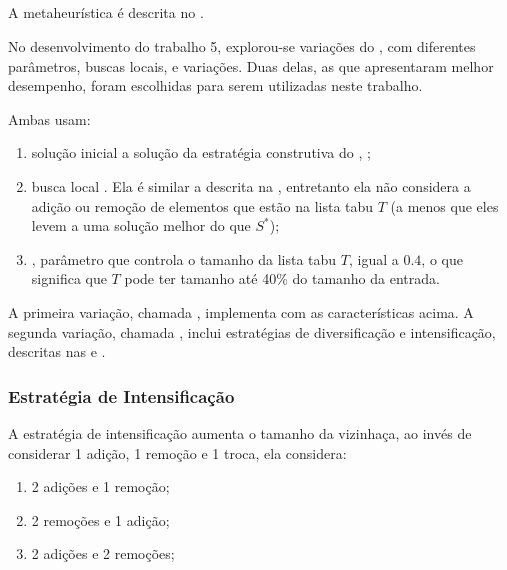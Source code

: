 \subsection{\tabu}
\label{subsection:tabu}

A metaheurística \tabu é descrita no .

No desenvolvimento do trabalho 5, explorou-se variações do \tabu, com diferentes parâmetros, buscas locais, e variações. Duas delas, as que apresentaram melhor desempenho, foram escolhidas para serem utilizadas neste trabalho.

Ambas usam:

\begin{enumerate}
    \item solução inicial a solução da estratégia construtiva do \grasp, ;
    \item busca local \bestImproving. Ela é similar a \bestImproving descrita na , entretanto ela não considera a adição ou remoção de elementos que estão na lista tabu $T$ (a menos que eles levem a uma solução melhor do que $S^*$);
    \item \tenureRatio, parâmetro que controla o tamanho da lista tabu $T$, igual a $0.4$, o que significa que $T$ pode ter tamanho até 40\% do tamanho da entrada.
\end{enumerate}

A primeira variação, chamada \tabuVanilla, implementa \tabu com as características acima. A segunda variação, chamada \tabuMod, inclui estratégias de diversificação e intensificação, descritas nas  e .

\subsubsection{Estratégia de Intensificação}
\label{subsubsection:tabu-intensification}

A estratégia de intensificação aumenta o tamanho da vizinhaça, ao invés de considerar 1 adição, 1 remoção e 1 troca, ela considera:

\begin{enumerate}
    \item 2 adições e 1 remoção;
    \item 2 remoções e 1 adição;
    \item 2 adições e 2 remoções;
\end{enumerate}

